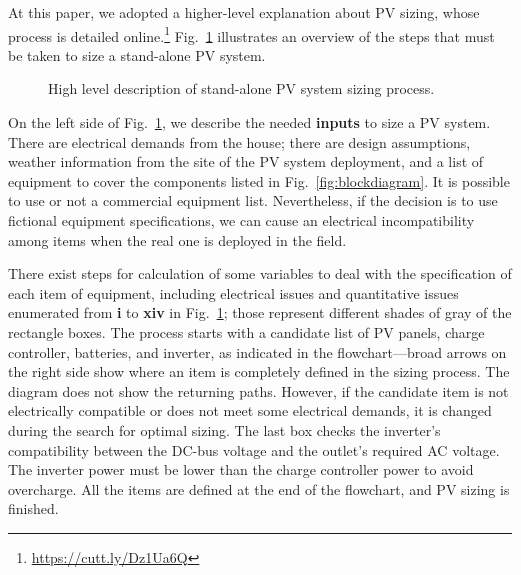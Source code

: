 \documentclass[review]{elsarticle}
\begin{document}
At this paper, we adopted a higher-level explanation about PV sizing, whose process is detailed online.\footnote{\href{https://cutt.ly/Dz1Ua6Q}{https://cutt.ly/Dz1Ua6Q}} 
Fig.~\ref{fig:flow} illustrates an overview of the steps that must be taken to size a stand-alone PV system.
%
\begin{figure}[ht]
\centering
\caption{High level description of stand-alone PV system sizing process.}
\label{fig:flow} 
\end{figure}
 

On the left side of Fig.~\ref{fig:flow}, we describe the needed \textbf{inputs} to size a PV system. There are electrical demands from the house; there are design assumptions, weather information from the site of the PV system deployment, and a list of equipment to cover the components listed in Fig.~\ref{fig:blockdiagram}. It is possible to use or not a commercial equipment list. Nevertheless, if the decision is to use fictional equipment specifications, we can cause an electrical incompatibility among items when the real one is deployed in the field.
 
There exist steps for calculation of some variables to deal with the specification of each item of equipment, including electrical issues and quantitative issues enumerated from \textbf{i} to \textbf{xiv} in Fig.~\ref{fig:flow}; those represent different shades of gray of the rectangle boxes. The process starts with a candidate list of PV panels, charge controller, batteries, and inverter, as indicated in the flowchart—broad arrows on the right side show where an item is completely defined in the sizing process. The diagram does not show the returning paths. However, if the candidate item is not electrically compatible or does not meet some electrical demands, it is changed during the search for optimal sizing. The last box checks the inverter's compatibility between the DC-bus voltage and the outlet's required AC voltage. The inverter power must be lower than the charge controller power to avoid overcharge. All the items are defined at the end of the flowchart, and PV sizing is finished.
\end{document}

